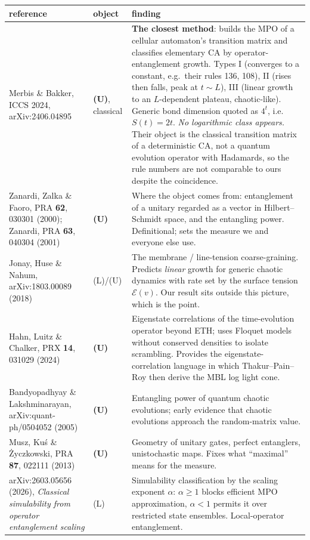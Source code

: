 \documentclass[11pt]{article}
\theoremstyle{plain}
\theoremstyle{remark}
\begin{document}
\begin{longtable}{p{}p{}p{}}
\toprule
reference & object & finding \\
\midrule
\endhead
Merbis \& Bakker, ICCS 2024, arXiv:2406.04895 & \textbf{(U)}, classical &
  \textbf{The closest method}: builds the MPO of a cellular automaton's
  transition matrix and classifies elementary CA by operator-entanglement
  growth. Types I (converges to a constant, e.g.\ their rules 136, 108), II
  (rises then falls, peak at $t\sim L$), III (linear growth to an $L$-dependent
  plateau, chaotic-like). Generic bond dimension quoted as $4^t$, i.e.\
  $S(t)=2t$. \emph{No logarithmic class appears.} Their object is the classical
  transition matrix of a deterministic CA, not a quantum evolution operator with
  Hadamards, so the rule numbers are not comparable to ours despite the
  coincidence. \\
\addlinespace
Zanardi, Zalka \& Faoro, PRA \textbf{62}, 030301 (2000); Zanardi, PRA
  \textbf{63}, 040304 (2001) & \textbf{(U)} &
  Where the object comes from: entanglement of a unitary regarded as a vector in
  Hilbert--Schmidt space, and the entangling power. Definitional; sets the
  measure we and everyone else use. \\
\addlinespace
Jonay, Huse \& Nahum, arXiv:1803.00089 (2018) & (L)/(U) &
  The membrane / line-tension coarse-graining. Predicts \emph{linear} growth for
  generic chaotic dynamics with rate set by the surface tension
  $\mathcal E(v)$. Our result sits outside this picture, which is the point. \\
\addlinespace
Hahn, Luitz \& Chalker, PRX \textbf{14}, 031029 (2024) & \textbf{(U)} &
  Eigenstate correlations of the time-evolution operator beyond ETH; uses
  Floquet models without conserved densities to isolate scrambling. Provides the
  eigenstate-correlation language in which Thakur--Pain--Roy then derive the MBL
  log light cone. \\
\addlinespace
Bandyopadhyay \& Lakshminarayan, arXiv:quant-ph/0504052 (2005) & \textbf{(U)} &
  Entangling power of quantum chaotic evolutions; early evidence that chaotic
  evolutions approach the random-matrix value. \\
\addlinespace
Musz, Ku\'s \& \.Zyczkowski, PRA \textbf{87}, 022111 (2013) & \textbf{(U)} &
  Geometry of unitary gates, perfect entanglers, unistochastic maps. Fixes what
  ``maximal'' means for the measure. \\
\addlinespace
arXiv:2603.05656 (2026), \emph{Classical simulability from operator entanglement
scaling} & (L) &
  Simulability classification by the scaling exponent $\alpha$: $\alpha\ge1$
  blocks efficient MPO approximation, $\alpha<1$ permits it over restricted
  state ensembles. Local-operator entanglement. \\
\bottomrule
\end{longtable}
\end{document}
